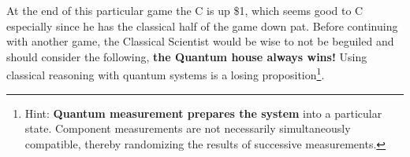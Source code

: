 At the end of this particular game the C is up \$1, which seems good to C
especially since he has the classical half of the game down pat. Before
continuing with another game, the Classical Scientist would be wise to not
be beguiled and should consider the following, {\bfseries the Quantum house
  always wins!} Using classical reasoning with quantum systems is a losing
proposition\footnote{%
  Hint: {\bfseries Quantum measurement prepares the system} into a particular
  state. Component measurements are not necessarily simultaneously
  compatible, thereby randomizing the results of successive measurements. %
}.

